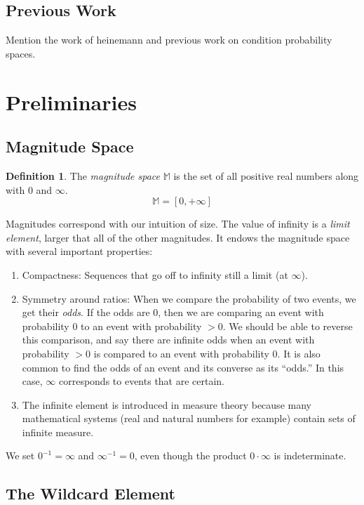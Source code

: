 \documentclass[twoside]{article}
\newcommand{\quotes}[1]{``#1''}
\theoremstyle{plain}%
\theoremstyle{definition}
\newtheorem{definition}{Definition}[section]
\theoremstyle{remark}
\begin{document}
\subsection{Previous Work}
Mention the work of heinemann\cite{heinemann} and previous work on condition probability spaces.

\section{Preliminaries}
\subsection{Magnitude Space}

\begin{definition}
The \textit{magnitude space} \(\mathbb{M}\) is the set of all positive real numbers along with \(0\) and \(\infty\).
\[\mathbb{M} = [0, +\infty]\]
\end{definition}

Magnitudes correspond with our intuition of size. The value of infinity is a \textit{limit element}, larger that all of the other magnitudes. It endows the magnitude space with several important properties:

\begin{enumerate}
\item Compactness: Sequences that go off to infinity still a limit (at \(\infty\)).
\item Symmetry around ratios: When we compare the probability of two events, we get their \textit{odds}. If the odds are 0, then we are comparing an event with probability 0 to an event with probability \(>0\). We should be able to reverse this comparison, and say there are infinite odds when an event with probability \(>0\) is compared to an event with probability 0. It is also common to find the odds of an event and its converse as its \quotes{odds.} In this case, \(\infty\) corresponds to events that are certain.
\item The infinite element is introduced in measure theory because many mathematical systems (real and natural numbers for example) contain sets of infinite measure.
\end{enumerate}

We set \(0^{-1} = \infty\) and \(\infty^{-1} = 0\), even though the product \(0 \cdot \infty\) is indeterminate.

\subsection{The Wildcard Element}
\end{document}
